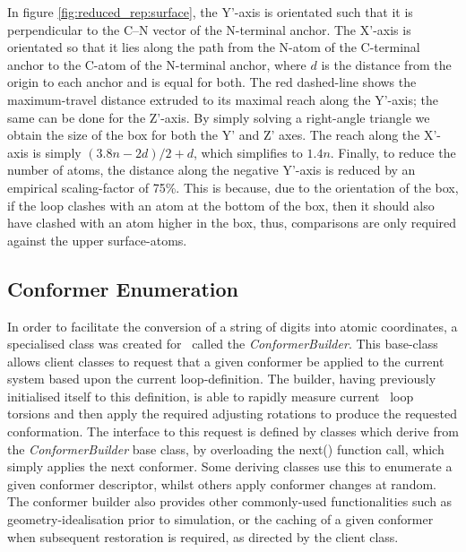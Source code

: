 In figure \ref{fig:reduced_rep:surface}, the Y'-axis is orientated such that it is perpendicular to the C--N vector of the N-terminal anchor. The X'-axis is orientated so that it lies along the path from the N-atom of the C-terminal anchor to the C-atom of the N-terminal anchor, where $d$ is the distance from the origin to each anchor and is equal for both. The red dashed-line shows the maximum-travel distance
extruded to its maximal reach along the Y'-axis; the same can be done for the Z'-axis. By simply solving a right-angle triangle we obtain the size of the box for both the Y' and Z' axes. The reach along the X'-axis is simply $(3.8n - 2d) / 2 + d$, which simplifies to $1.4n$.
Finally, to reduce the number of atoms, the distance along the negative Y'-axis is reduced by an empirical scaling-factor of 75\%. This is because, due to the orientation of the box, if the loop clashes with an atom at the bottom of the box, then it should also have clashed with an atom higher in the box, thus, comparisons are only required against the upper surface-atoms.



\subsection{Conformer Enumeration}

In order to facilitate the conversion of a string of digits into atomic coordinates, a specialised class 
was created for \pd\ called the \textsl{ConformerBuilder}. This base-class allows client classes to request 
that a given conformer be applied to the current system based upon the current loop-definition. The builder, having previously initialised itself to this definition, is able to rapidly 
measure current \mainchain\ loop torsions and then apply the required adjusting rotations to produce the 
requested conformation. The interface to this request is defined by classes which derive from the 
\textsl{ConformerBuilder} base class, by overloading the next() function call, which simply applies the next 
conformer. Some deriving classes use this to enumerate a given conformer descriptor, whilst others apply 
conformer changes at random. The conformer builder also provides other commonly-used functionalities such 
as geometry-idealisation prior to simulation, or the caching of a given conformer when subsequent 
restoration is required, as directed by the client class.

